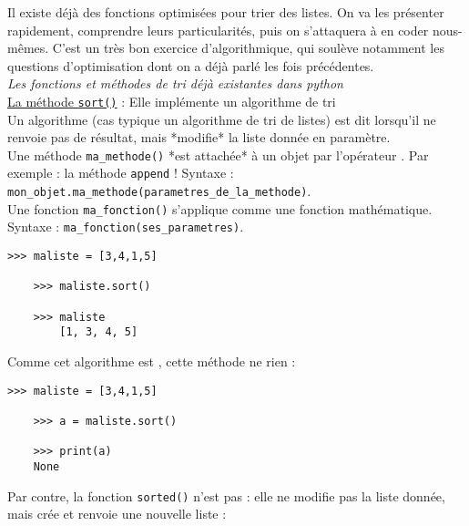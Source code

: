 


Il existe déjà des fonctions optimisées pour trier des listes. On va les présenter rapidement, comprendre leurs particularités, puis on s'attaquera à en coder nous-mêmes. C'est un très bon exercice d'algorithmique, qui soulève notamment les questions d'optimisation dont on a déjà parlé les fois précédentes. \\



\exo
\textit{Les fonctions et méthodes de tri déjà existantes dans python}\\

\nipuce \ul{La méthode \texttt{sort()}} : Elle implémente un algorithme de tri \\
 Un algorithme (cas typique un algorithme de tri de listes) est dit  lorsqu'il ne renvoie pas de résultat, mais *modifie* la liste donnée en paramètre. \\
 Une méthode \texttt{ma\_methode()} *est attachée* à un objet par l'opérateur . Par exemple : la méthode \texttt{append} ! Syntaxe : \texttt{mon\_objet.ma\_methode(parametres\_de\_la\_methode)}. \\
Une fonction \texttt{ma\_fonction()} s'applique comme une fonction mathématique. Syntaxe : \texttt{ma\_fonction(ses\_parametres)}.

\begin{Verbatim}[tabsize=4]
	>>> maliste = [3,4,1,5]

	>>> maliste.sort()

	>>> maliste
		[1, 3, 4, 5]
\end{Verbatim}

Comme cet algorithme est , cette méthode ne  rien :
\begin{Verbatim}[tabsize=4]
	>>> maliste = [3,4,1,5]

	>>> a = maliste.sort()

	>>> print(a)
	None
\end{Verbatim}

\nipuce  Par contre, la fonction \texttt{sorted()} n'est pas  : elle ne modifie pas la liste donnée, mais crée et renvoie une nouvelle liste :

